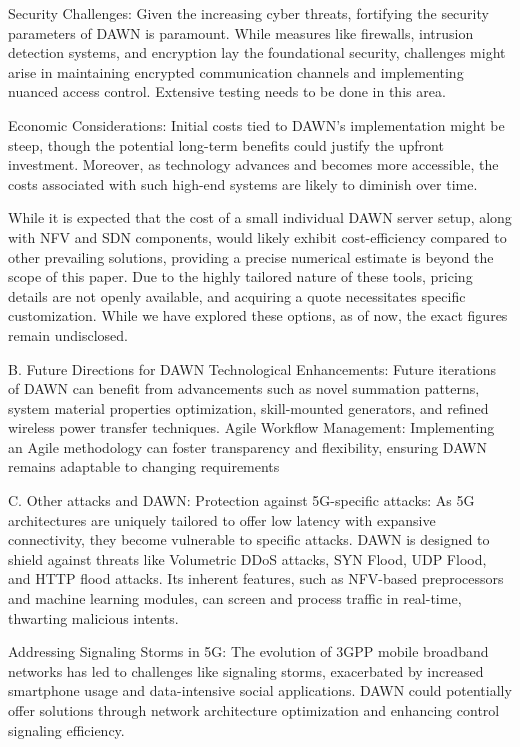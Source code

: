 \documentclass[conference]{IEEEtran}
\begin{document}
Security Challenges: 
Given the increasing cyber threats, fortifying the security parameters of DAWN is paramount. While measures like firewalls, intrusion detection systems, and encryption lay the foundational security, challenges might arise in maintaining encrypted communication channels and implementing nuanced access control. Extensive testing needs to be done in this area.

Economic Considerations: 
Initial costs tied to DAWN's implementation might be steep, though the potential long-term benefits could justify the upfront investment. Moreover, as technology advances and becomes more accessible, the costs associated with such high-end systems are likely to diminish over time.

While it is expected that the cost of a small individual DAWN server setup, along with NFV and SDN components, would likely exhibit cost-efficiency compared to other prevailing solutions, providing a precise numerical estimate is beyond the scope of this paper. Due to the highly tailored nature of these tools, pricing details are not openly available, and acquiring a quote necessitates specific customization. While we have explored these options, as of now, the exact figures remain undisclosed.

B. Future Directions for DAWN
Technological Enhancements:
Future iterations of DAWN can benefit from advancements such as novel summation patterns, system material properties optimization, skill-mounted generators, and refined wireless power transfer techniques.
Agile Workflow Management: 
Implementing an Agile methodology can foster transparency and flexibility, ensuring DAWN remains adaptable to changing requirements

C. Other attacks and DAWN: 
Protection against 5G-specific attacks: 
As 5G architectures are uniquely tailored to offer low latency with expansive connectivity, they become vulnerable to specific attacks. DAWN is designed to shield against threats like Volumetric DDoS attacks, SYN Flood, UDP Flood, and HTTP flood attacks. Its inherent features, such as NFV-based preprocessors and machine learning modules, can screen and process traffic in real-time, thwarting malicious intents.

Addressing Signaling Storms in 5G: 
The evolution of 3GPP mobile broadband networks has led to challenges like signaling storms, exacerbated by increased smartphone usage and data-intensive social applications. DAWN could potentially offer solutions through network architecture optimization and enhancing control signaling efficiency.
\end{document}
